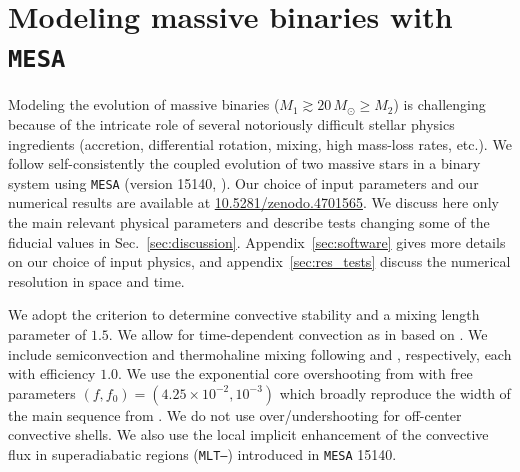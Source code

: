 \documentclass[twocolumn,twocolappendix,trackchanges]{aastex63}
\DeclareRobustCommand{\Secref}[1]{Sec.~\ref{#1}}
\begin{document}
\section{Modeling massive binaries with \texttt{MESA}}
\label{sec:methods}

Modeling the evolution of massive binaries
($M_1\gtrsim 20\,M_\odot \geq M_2$) is challenging because of the
intricate role of several notoriously difficult stellar physics
ingredients (accretion, differential rotation, mixing, high mass-loss
rates, etc.). We follow self-consistently the coupled evolution
of two massive stars in a binary system using \texttt{MESA} (version
15140, \citealt{paxton:11, paxton:13, paxton:15, paxton:18,
  paxton:19}). Our choice of input parameters and our numerical
results are available at \url{10.5281/zenodo.4701565}. We discuss here
only the main relevant physical parameters and describe tests changing
some of the fiducial values in
\Secref{sec:discussion}. Appendix~\ref{sec:software} gives more
details on our choice of input physics, and
appendix~\ref{sec:res_tests} discuss the numerical resolution in space
and time.

We adopt the \cite{ledoux:47} criterion to determine convective
stability and a mixing length parameter of $1.5$. We allow for
time-dependent convection as in \cite{renzo:20:ppi_conv} based on
\cite{arnett:69}. We include semiconvection and thermohaline mixing
following \cite{langer:83} and \cite{kippenhahn:80}, respectively,
each with efficiency $1.0$. We use the exponential core overshooting
from \cite{herwig:00} with free parameters
$(f, f_0)=(4.25\times10^{-2}, 10^{-3})$ \citep{claret:17} which
broadly reproduce the width of the main sequence from
\cite{brott:11}. We do not use over/undershooting for off-center
convective shells. We also use the local implicit enhancement of the
convective flux in superadiabatic regions (\texttt{MLT--}) introduced
in \texttt{MESA} 15140.
\end{document}
